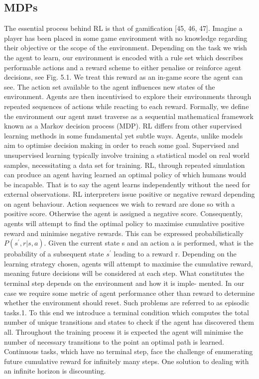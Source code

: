 \documentclass[runningheads]{llncs}
\begin{document}
\subsection{MDPs}
The essential process behind RL is that of gamification [45, 46, 47]. Imagine a player has
been placed in some game environment with no knowledge regarding their objective or
the scope of the environment. Depending on the task we wish the agent to learn, our
environment is encoded with a rule set which describes performable actions and a reward scheme to either penalise or reinforce agent decisions, see Fig. 5.1. We treat this reward as
an in-game score the agent can see. The action set available to the agent influences new
states of the environment. Agents are then incentivised to explore their environments
through repeated sequences of actions while reacting to each reward. Formally, we define
the environment our agent must traverse as a sequential mathematical framework known
as a Markov decision process (MDP). RL differs from other supervised learning methods in some fundamental yet subtle
ways. Agents, unlike models aim to optimise decision making in order to reach some goal.
Supervised and unsupervised learning typically involve training a statistical model on real
world samples, necessitating a data set for training. RL, through repeated simulation can
produce an agent having learned an optimal policy of which humans would be incapable.
That is to say the agent learns independently without the need for external observations.
RL interpreters issue positive or negative reward depending on agent behaviour.
Action sequences we wish to reward are done so with a positive score. Otherwise the
agent is assigned a negative score. Consequently, agents will attempt to find the optimal
policy to maximise cumulative positive reward and minimise negative rewards. This
can be expressed probabilistically $P(s^{\prime},r|s,a)$. Given the current state s and an action a is performed, what is the probability of a subsequent state $s^{\prime}$ leading to a reward r.
Depending on the learning strategy chosen, agents will attempt to maximise the cumulative
reward, meaning future decisions will be considered at each step. What constitutes the terminal step depends on the environment and how it is imple-
mented. In our case we require some metric of agent performance other than reward
to determine whether the environment should reset. Such problems are referred to as
episodic tasks.1. To this end we introduce a terminal condition which computes the total
number of unique transitions and states to check if the agent has discovered them all.
Throughout the training process it is expected the agent will minimise the number of
necessary transitions to the point an optimal path is learned. Continuous tasks, which
have no terminal step, face the challenge of enumerating future cumulative reward for
infinitely many steps. One solution to dealing with an infinite horizon is discounting.
\end{document}
